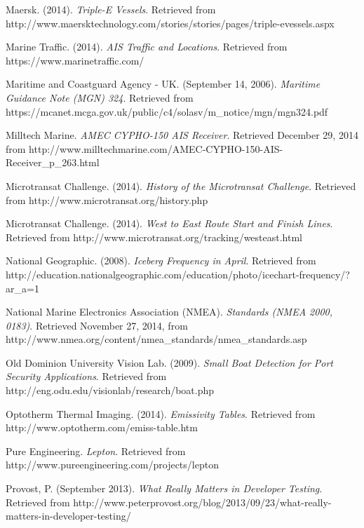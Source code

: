 \begin{thebibliography}{99}
 Maersk. (2014). \textit{Triple-E Vessels}. Retrieved from http://www.maersktechnology.com/stories/stories/pages/triple-evessels.aspx

 Marine Traffic. (2014). \textit{AIS Traffic and Locations}. Retrieved from https://www.marinetraffic.com/

 Maritime and Coastguard Agency - UK. (September 14, 2006). \textit{Maritime Guidance Note (MGN) 324}. Retrieved from https://mcanet.mcga.gov.uk/public/c4/solasv/m\_notice/mgn/mgn324.pdf

 Milltech Marine. \textit{AMEC CYPHO-150 AIS Receiver}. Retrieved December 29, 2014 from http://www.milltechmarine.com/AMEC-CYPHO-150-AIS-Receiver\_p\_263.html

 Microtransat Challenge. (2014). \textit{History of the Microtransat Challenge}. Retrieved from http://www.microtransat.org/history.php

 Microtransat Challenge. (2014). \textit{West to East Route Start and Finish Lines}. Retrieved from http://www.microtransat.org/tracking/westeast.html

 National Geographic. (2008). \textit{Iceberg Frequency in April}. Retrieved from http://education.nationalgeographic.com/education/photo/icechart-frequency/?ar\_a=1

 National Marine Electronics Association (NMEA). \textit{Standards (NMEA 2000, 0183)}. Retrieved November 27, 2014, from http://www.nmea.org/content/nmea\_standards/nmea\_standards.asp

 Old Dominion University Vision Lab. (2009). \textit{Small Boat Detection for Port Security Applications}. Retrieved from http://eng.odu.edu/visionlab/research/boat.php

 Optotherm Thermal Imaging. (2014). \textit{Emissivity Tables}. Retrieved from http://www.optotherm.com/emiss-table.htm

 Pure Engineering. \textit{Lepton}. Retrieved from http://www.pureengineering.com/projects/lepton

 Provost, P. (September 2013). \textit{What Really Matters in Developer Testing}. Retrieved from http://www.peterprovost.org/blog/2013/09/23/what-really-matters-in-developer-testing/


\end{thebibliography}
